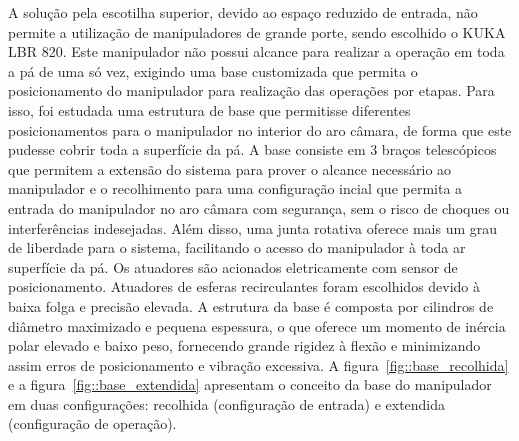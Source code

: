 A solução pela escotilha superior, devido ao espaço reduzido de entrada, não
permite a utilização de manipuladores de grande porte, sendo escolhido o KUKA
LBR 820. Este manipulador não possui alcance para realizar a operação em toda a
pá de uma só vez, exigindo uma base customizada que permita o
posicionamento do manipulador para realização das operações por etapas. Para
isso, foi estudada uma estrutura de base que permitisse diferentes
posicionamentos para o manipulador no interior do aro câmara, de forma que este
pudesse cobrir toda a superfície da pá. A base consiste em 3 braços
telescópicos que permitem a extensão do sistema para prover o alcance
necessário ao manipulador e o recolhimento para uma configuração incial que
permita a entrada do manipulador no aro câmara com segurança, sem o risco de
choques ou interferências indesejadas. Além disso, uma junta rotativa oferece mais um grau
de liberdade para o sistema, facilitando o acesso do manipulador à toda ar
superfície da pá. Os atuadores são acionados eletricamente com sensor de
posicionamento. Atuadores de esferas recirculantes foram escolhidos devido à
baixa folga e precisão elevada. A estrutura da base é composta por cilindros de
diâmetro maximizado e pequena espessura, o que oferece um momento de inércia
polar elevado e baixo peso, fornecendo grande rigidez à flexão e minimizando
assim erros de posicionamento e vibração excessiva. A
figura~\ref{fig::base_recolhida} e a figura~\ref{fig::base_extendida} apresentam
o conceito da base do manipulador em duas configurações: recolhida (configuração
de entrada) e extendida (configuração de operação).

